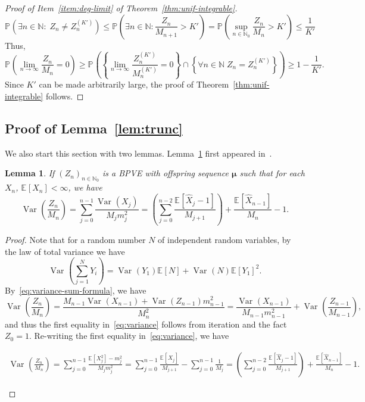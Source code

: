 \documentclass[12pt]{article}
\newtheorem{lem}[thm]{Lemma}
\theoremstyle{definition}
\newcommand{\E}[2][]{\ensuremath{\mathbb{E}_{#1}\left[#2 \right]}}
\newcommand{\Prob}[2][]{\ensuremath{\mathbb{P}_{#1} \left(#2 \right)}}
\newcommand{\Var}[2][]{\operatorname{Var}_{#1}\left(#2\right)}
\begin{document}
\begin{proof}[Proof of Item~\ref{item:deg-limit} of Theorem~\ref{thm:unif-integrable}]
\[
\Prob{\exists n \in \mathbb{N}\colon \; Z_{n} \neq Z^{(K')}_{n} } \leq \Prob{\exists n \in \mathbb{N}\colon \frac{Z_n}{M_{n+1}} > K'} = \Prob{\sup_{n \in \mathbb{N}_0} \frac{Z_{n}}{M_n} > K'} \leq \frac{1}{K'}
\]
Thus, 
\[
\Prob{\lim_{n \to \infty} \frac{Z_{n}}{M_{n}} = 0} \geq \Prob{\left\{ \lim_{n \to \infty} \frac{Z^{(K')}_n}{M^{(K')}_{n}} = 0 \right\} \cap \left\{\forall n \in \mathbb{N} \; Z_{n} = Z^{(K')}_{n}\right\}} \geq 1 - \frac{1}{K'}.
\]
Since $K'$ can be made arbitrarily large, the proof of Theorem~\ref{thm:unif-integrable} follows. 
\end{proof}

\subsection{Proof of Lemma~\ref{lem:trunc}}
We also start this section with two lemmas. Lemma~\ref{lem:variance} first appeared in~\cite{fearn}. 

\begin{lem} \label{lem:variance}
    If $(Z_{n})_{n \in \mathbb{N}_0}$ is a BPVE with offspring sequence $\boldsymbol{\mu}$ such that for each $X_{n}$, $\E{X_n} < \infty$, we have 
    \begin{equation} \label{eq:variance}
    \Var{\frac{Z_{n}}{M_n}} = \sum_{j=0}^{n-1} \frac{\Var{X_j}}{M_{j}m_j^2} =
    \left(\sum_{j=0}^{n-2} \frac{\E{\widehat{X}_j - 1}}{M_{j+1}}\right) + \frac{\E{\widehat{X}_{n-1}}}{M_{n}} - 1. 
    \end{equation}    
\end{lem}
\begin{proof}
Note that for a random number $N$ of independent random variables, by the law of total variance we have 
\begin{equation} \label{eq:variance-sum-formula}
    \Var{\sum_{j=1}^{N} Y_{i}} = \Var{Y_1}\E{N} + \Var{N} \E{Y_{1}}^2.
\end{equation}
By~\eqref{eq:variance-sum-formula}, we have
\[
\Var{\frac{Z_{n}}{M_n}} = \frac{M_{n-1}\Var{X_{n-1}} + \Var{Z_{n-1}} m_{n-1}^2}{M_n^2} = \frac{\Var{X_{n-1}}}{M_{n-1} m_{n-1}^2} + \Var{\frac{Z_{n-1}}{M_{n-1}}},  
\]
and thus the first equality in~\eqref{eq:variance} follows from iteration and the fact $Z_0 = 1$. Re-writing the first equality in~\eqref{eq:variance}, we have 
\begin{linenomath}
    \begin{align*}
        \Var{\frac{Z_{n}}{M_n}} = \sum_{j=0}^{n-1} \frac{\E{X_{j}^2} - m_j^2}{M_{j}m_j^2} = \sum_{j=0}^{n-1} \frac{\E{\widehat{X}_j}}{M_{j+1}} - \sum_{j=0}^{n-1} \frac{1}{M_j} = \left(\sum_{j=0}^{n-2} \frac{\E{\widehat{X}_{j} - 1}}{M_{j+1}}\right) + \frac{\E{\widehat{X}_{n-1}}}{M_{n}} - 1. 
    \end{align*}
\end{linenomath}
\end{proof}
\end{document}
